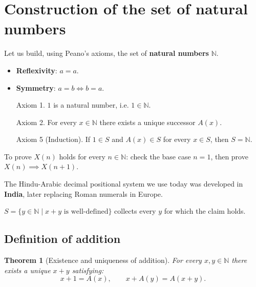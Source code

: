 \documentclass[12pt, a4paper, english]{book}
\numberwithin{figure}{section}
\numberwithin{equation}{section}
\theoremstyle{springerth}
\newtheorem{theorem}{Theorem}[section]
\theoremstyle{springerdef}
\begin{document}
\section{Construction of the set of natural numbers}
Let us build, using Peano's axioms, the set of \textbf{natural numbers} $\mathbb{N}$.

\begin{itemize}
\item \textbf{Reflexivity}: $a=a$.
\item \textbf{Symmetry}: $a=b \iff b=a$.
\end{itemize}

\begin{enumerate}[leftmargin=2cm, align=left]
    \item[Axiom 1.] $1$ is a natural number, i.e. $1\in\mathbb{N}$.
    \item[Axiom 2.] For every $x\in\mathbb{N}$ there exists a unique successor $A(x)$.\footnotemark[1]
    \item[Axiom 5 (Induction).] If $1\in S$ and $A(x)\in S$ for every $x\in S$, then $S=\mathbb{N}$.
\end{enumerate}


\begin{important}
To prove $X(n)$ holds for every $n \in \mathbb{N}$: check the base case $n=1$, then prove $X(n) \implies X(n+1)$.
\end{important}

\begin{academicnote}
The Hindu-Arabic decimal positional system we use today was developed in \textbf{India}, later replacing Roman numerals in Europe.
\end{academicnote}

\begin{logicbox}
$S = \{ y \in \mathbb{N} \mid x + y \text{ is well-defined} \}$ collects every $y$ for which the claim holds.
\end{logicbox}

\subsection{Definition of addition}

\begin{theorem}[Existence and uniqueness of addition]
For every $x, y \in \mathbb{N}$ there exists a unique $x+y$ satisfying:
\begin{equation*}
    x + 1 = A(x), \qquad x + A(y) = A(x+y).
\end{equation*}
\end{theorem}
\end{document}

